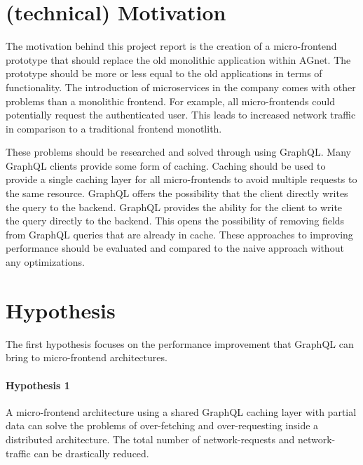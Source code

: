 



\section{(technical) Motivation}

The motivation behind this project report is the creation of a micro-frontend prototype that should replace the old monolithic application within AGnet. The prototype should be more or less equal to the old applications in terms of functionality. The introduction of microservices in the company comes with other problems than a monolithic frontend. For example, all micro-frontends could potentially request the authenticated user. This leads to increased network traffic in comparison to a traditional frontend monotlith.

These problems should be researched and solved through using GraphQL. Many GraphQL clients provide some form of caching. Caching should be used to provide a single caching layer for all micro-frontends to avoid multiple requests to the same resource. GraphQL offers the possibility that the client directly writes the query to the backend. GraphQL provides the ability for the client to write the query directly to the backend. This opens the possibility of removing fields from GraphQL queries that are already in cache. These approaches to improving performance should be evaluated and compared to the naive approach without any optimizations.

\section{Hypothesis}

The first hypothesis focuses on the performance improvement that GraphQL can bring to micro-frontend architectures.

\paragraph{Hypothesis 1} 
A micro-frontend architecture using a shared GraphQL caching layer with partial data can solve the problems of over-fetching and over-requesting inside a distributed architecture. The total number of network-requests and network-traffic can be drastically reduced.\\\\

